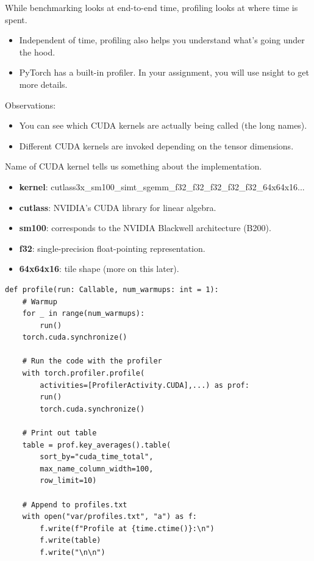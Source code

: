 \documentclass[12pt,twoside]{article}
\begin{document}
While benchmarking looks at end-to-end time, profiling looks at where time is spent.

\begin{itemize}
    \item Independent of time, profiling also helps you understand what's going under the hood.
    \item PyTorch has a built-in profiler. In your assignment, you will use nsight to get more details.
\end{itemize}

Observations:

\begin{itemize}
    \item You can see which CUDA kernels are actually being called (the long names).
    \item Different CUDA kernels are invoked depending on the tensor dimensions.
\end{itemize}

Name of CUDA kernel tells us something about the implementation.

\begin{itemize}
    \item \textbf{kernel}: cutlass3x\_sm100\_simt\_sgemm\_f32\_f32\_f32\_f32\_f32\_64x64x16...
    \item \textbf{cutlass}: NVIDIA's CUDA library for linear algebra.
    \item \textbf{sm100}: corresponds to the NVIDIA Blackwell architecture (B200).
    \item \textbf{f32}: single-precision float-pointing representation.
    \item \textbf{64x64x16}: tile shape (more on this later).
\end{itemize}

\begin{verbatim}
def profile(run: Callable, num_warmups: int = 1):
    # Warmup
    for _ in range(num_warmups):
        run()
    torch.cuda.synchronize()
    
    # Run the code with the profiler
    with torch.profiler.profile(
        activities=[ProfilerActivity.CUDA],...) as prof:
        run()
        torch.cuda.synchronize()
    
    # Print out table
    table = prof.key_averages().table(
        sort_by="cuda_time_total",
        max_name_column_width=100,
        row_limit=10)
    
    # Append to profiles.txt
    with open("var/profiles.txt", "a") as f:
        f.write(f"Profile at {time.ctime()}:\n")
        f.write(table)
        f.write("\n\n")
\end{verbatim}
\end{document}
